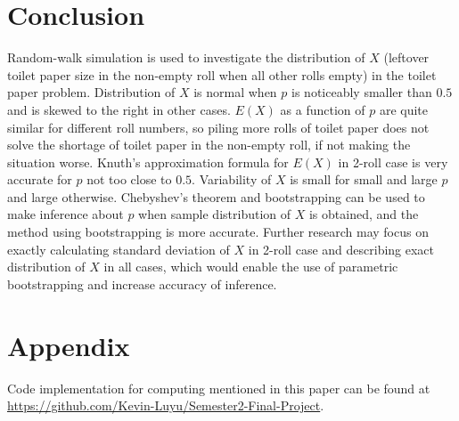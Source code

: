 \documentclass{article}
\begin{document}
\section{Conclusion}
Random-walk simulation is used to investigate the distribution of $X$ (leftover toilet paper size in the non-empty roll when all other rolls empty) in the toilet paper problem\cite{Knuth1984}. Distribution of $X$ is normal when $p$ is noticeably smaller than $0.5$ and is skewed to the right in other cases. $E(X)$ as a function of $p$ are quite similar for different roll numbers, so piling more rolls of toilet paper does not solve the shortage of toilet paper in the non-empty roll, if not making the situation worse. Knuth's approximation formula for $E(X)$ in 2-roll case is very accurate for $p$ not too close to $0.5$. Variability of $X$ is small for small and large $p$ and large otherwise. Chebyshev's theorem and bootstrapping can be used to make inference about $p$ when sample distribution of $X$ is obtained, and the method using bootstrapping is more accurate. Further research may focus on exactly calculating standard deviation of $X$ in 2-roll case and describing exact distribution of $X$ in all cases, which would enable the use of parametric bootstrapping and increase accuracy of inference. 

\section{Appendix}
Code implementation for computing mentioned in this paper can be found at \url{https://github.com/Kevin-Luyu/Semester2-Final-Project}. 


\end{document}
